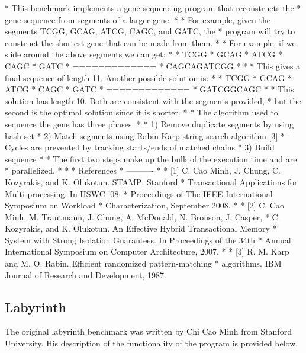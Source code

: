 \documentclass{article}
\begin{document}
* This benchmark implements a gene sequencing program that reconstructs the 
* gene sequence from segments of a larger gene.
* 
* For example, given the segments TCGG, GCAG, ATCG, CAGC, and GATC, the 
* program will try to construct the shortest gene that can be made from them.
*
* For example, if we slide around the above segments we can get:
*
*             TCGG
*        GCAG
*            ATCG
*      CAGC
*           GATC
*     =============
*      CAGCAGATCGG
*
*
* This gives a final sequence of length 11. Another possible solution is:
*
*        TCGG
*           GCAG
*       ATCG
*            CAGC
*      GATC
*     =============
*      GATCGGCAGC
*
* This solution has length 10. Both are consistent with the segments provided,
* but the second is the optimal solution since it is shorter.
*
* The algorithm used to sequence the gene has three phases:
*
*    1) Remove duplicate segments by using hash-set
*    2) Match segments using Rabin-Karp string search algorithm [3]
*       - Cycles are prevented by tracking starts/ends of matched chains
*    3) Build sequence
*
* The first two steps make up the bulk of the execution time and are 
* parallelized.
*
*
* References
* ----------
*
* [1] C. Cao Minh, J. Chung, C. Kozyrakis, and K. Olukotun. STAMP: Stanford 
*     Transactional Applications for Multi-processing. In IISWC '08: 
*     Proceedings of The IEEE International Symposium on Workload 
*     Characterization, September 2008. 
*
* [2] C. Cao Minh, M. Trautmann, J. Chung, A. McDonald, N. Bronson, J. Casper,
*     C. Kozyrakis, and K. Olukotun. An Effective Hybrid Transactional Memory
*     System with Strong Isolation Guarantees. In Proceedings of the 34th 
*     Annual International Symposium on Computer Architecture, 2007.
*
* [3] R. M. Karp and M. O. Rabin. Efficient randomized pattern-matching
*     algorithms. IBM Journal of Research and Development, 1987.

\subsection{Labyrinth}

The original labyrinth benchmark was written by Chi Cao Minh from Stanford 
University. His description of the functionality of the program is provided 
below.
\end{document}
